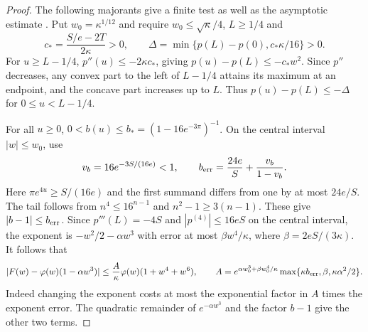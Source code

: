 \begin{proof}
The following majorants give a finite test as well as the asymptotic
estimate \cite{EZWindow}. Put \(w_0=\kappa^{1/12}\) and require
\(w_0\le\sqrt\kappa/4\), \(L\ge1/4\) and
\[
 c_*=\frac{S/e-2T}{2\kappa}>0,\qquad
 \Delta=\min\{p(L)-p(0),c_*\kappa/16\}>0 .
\]
For \(u\ge L-1/4\), \(p''(u)\le-2\kappa c_*\), giving
\(p(u)-p(L)\le-c_* w^2\). Since \(p''\) decreases, any convex part to the
left of \(L-1/4\) attains its maximum at an endpoint, and the concave
part increases up to \(L\). Thus \(p(u)-p(L)\le-\Delta\) for
\(0\le u<L-1/4\).

For all \(u\ge0\), \(0<b(u)\le b_*=(1-16e^{-3\pi})^{-1}\).
On the central interval \(|w|\le w_0\), use
\[
 v_b=16e^{-3S/(16e)}<1,\qquad b_{\rm err}=\frac{24e}{S}+\frac{v_b}{1-v_b}.
\]
Here \(\pi e^{4u}\ge S/(16e)\) and the first summand differs from one
by at most \(24e/S\). The tail follows from \(n^4\le16^{n-1}\) and
\(n^2-1\ge3(n-1)\). These give \(|b-1|\le b_{\rm err}\).
Since \(p'''(L)=-4S\) and \(|p^{(4)}|\le16eS\) on the central
interval, the exponent is \(-w^2/2-\alpha w^3\) with error at most
\(\beta w^4/\kappa\), where \(\beta=2eS/(3\kappa)\). It follows that
\[
 |F(w)-\varphi(w)(1-\alpha w^3)|
 \le \frac{A}{\kappa}\varphi(w)(1+w^4+w^6),\qquad
 A=e^{\alpha w_0^3+\beta w_0^4/\kappa}
        \max\{\kappa b_{\rm err},\beta,\kappa\alpha^2/2\}.
\]
Indeed changing the exponent costs at most the exponential factor
in \(A\) times the exponent error. The quadratic remainder of
\(e^{-\alpha w^3}\) and the factor \(b-1\) give the other two terms.


\end{proof}
